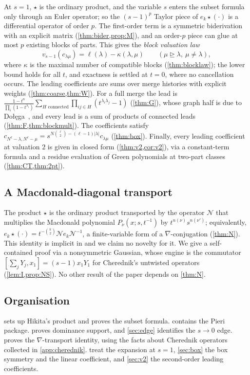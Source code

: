 \documentclass[11pt]{amsart}
\theoremstyle{definition}
\theoremstyle{remark}
\numberwithin{equation}{section}
\newcommand{\val}{v}
\begin{document}
At $s=1$, $\star$ is the ordinary product, and the variable $s$ enters the subset formula only through an Euler operator; so the $(s-1)^p$ Taylor piece of $e_k\star(\cdot)$ is a differential operator of order $p$. The first-order term is a symmetric biderivation with an explicit matrix (\cref{thm:bider,prop:M}), and an order-$p$ piece can glue at most $p$ existing blocks of parts. This gives the \emph{block valuation law}
\[ \val_{s-1}(c_{\lambda\mu})=\ell(\lambda)-\kappa(\lambda,\mu)\qquad(\mu\trianglerighteq\lambda,\ \mu\ne\lambda), \]
where $\kappa$ is the maximal number of compatible blocks (\cref{thm:blocklaw}); the lower bound holds for all $t$, and exactness is settled at $t=0$, where no cancellation occurs. The leading coefficients are sums over merge histories with explicit weights (\cref{thm:coarse,thm:W}). For a full merge the lead is $\frac{1-t^n}{\prod_i(1-t^{\lambda_i})}\sum_{H\text{ connected}}\prod_{ij\in H}(t^{\lambda_i\lambda_j}-1)$ (\cref{thm:G}), whose graph half is due to Do{\l}{\k{e}}ga~\cite{Dolega19}, and every lead is a sum of products of connected leads (\cref{thm:F,thm:blockmult}). The coefficients satisfy $c_{N^\ell-\lambda,N^\ell-\mu}=s^{N\binom\ell2-(\ell-1)|\lambda|}c_{\lambda\mu}$ (\cref{thm:box}). Finally, every leading coefficient at valuation $2$ is given in closed form (\cref{thm:v2,cor:v2}), via a constant-term formula and a residue evaluation of Green polynomials at two-part classes (\cref{thm:CT,thm:2pt}).

\subsection*{A Macdonald-diagonal transport}
The product $\star$ is the ordinary product transported by the operator $\mathcal N$ that multiplies the Macdonald polynomial $P_\nu(x;s,t^{-1})$ by $t^{n(\nu)}s^{n(\nu')}$; equivalently, $e_k\star(\cdot)=t^{-\binom k2}\mathcal N e_k\mathcal N^{-1}$, a finite-variable form of a $\nabla$-conjugation (\cref{thm:N}). This identity is implicit in \cite{DFK19} and we claim no novelty for it. We give a self-contained proof via a nonsymmetric Gaussian, whose engine is the commutator $[\sum_jY_j,x_1]=(s-1)x_1Y_1$ for Cherednik's untwisted operators (\cref{lem:I,prop:NS}). No other result of the paper depends on \cref{thm:N}.

\subsection*{Organisation}
 sets up Hikita's product and proves the subset formula.  contains the Pieri package.  proves dominance support, and \cref{sec:edge} identifies the $s\to0$ edge.  proves the $\nabla$-transport identity, using the facts about Cherednik operators collected in \cref{app:cherednik}.  treat the expansion at $s=1$, \cref{sec:box} the box symmetry and the linear coefficient, and \cref{sec:v2} the second-order leading coefficients.
\end{document}
